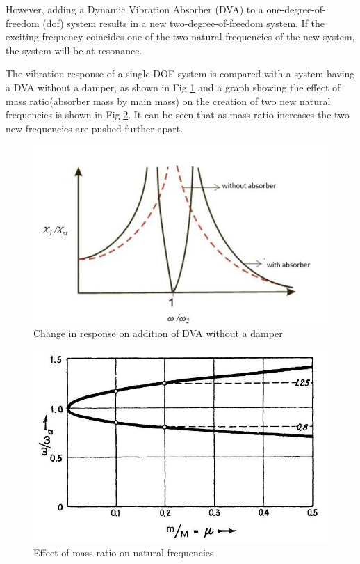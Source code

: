 However, adding a Dynamic Vibration Absorber (DVA) to a one-degree-of-freedom (dof) system results in a new two-degree-of-freedom system. If the exciting frequency coincides one of the two natural frequencies of the new system, the system will be at resonance.

The vibration response of a single DOF system is compared with a system having a DVA without a damper, as shown in Fig \ref{changeInGraph} and a graph showing the effect of mass ratio(absorber mass by main mass) on the creation of two new natural frequencies is shown in Fig \ref{massRatio}. It can be seen that as mass ratio increases the two new frequencies are pushed further apart.
\begin{figure}[h!]
\centering
\includegraphics[scale=0.5]{"figures/changeInGraph"}
\caption{Change in response on addition of DVA without a damper}
\label{changeInGraph}
\end{figure}
\begin{figure}[h!]
\centering
\includegraphics[scale=0.3]{"figures/massRatio"}
\caption{Effect of mass ratio on natural frequencies}
\label{massRatio}
\end{figure}

